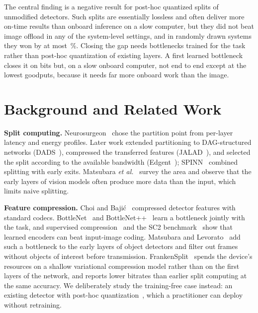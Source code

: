 \documentclass[journal,twocolumn,10pt]{IEEEtran}
\begin{document}
The central finding is a negative result for post-hoc quantized splits of unmodified detectors. Such splits are essentially lossless and often deliver more on-time results than onboard inference on a slow computer, but they did not beat image offload in any of the \NumCells{} system-level settings, and in randomly drawn systems they won by at most \GenMaxSplitGainPct\,\%. Closing the gap needs bottlenecks trained for the task~\cite{matsubara2023sc2,shao2020bottlenetpp} rather than post-hoc quantization of existing layers. A first learned bottleneck closes it on bits but, on a slow onboard computer, not end to end except at the lowest goodputs, because it needs far more onboard work than the image.

\section{Background and Related Work}
\textbf{Split computing.} Neurosurgeon~\cite{kang2017neurosurgeon} chose the partition point from per-layer latency and energy profiles. Later work extended partitioning to DAG-structured networks (DADS~\cite{hu2019dads}), compressed the transferred features (JALAD~\cite{li2018jalad}), and selected the split according to the available bandwidth (Edgent~\cite{li2020edgent}); SPINN~\cite{laskaridis2020spinn} combined splitting with early exits. Matsubara \emph{et al.}~\cite{matsubara2022survey} survey the area and observe that the early layers of vision models often produce more data than the input, which limits naive splitting.

\textbf{Feature compression.} Choi and Baji\'{c}~\cite{choi2018deep} compressed detector features with standard codecs. BottleNet~\cite{eshratifar2019bottlenet} and BottleNet++~\cite{shao2020bottlenetpp} learn a bottleneck jointly with the task, and supervised compression~\cite{matsubara2022supervised} and the SC2 benchmark~\cite{matsubara2023sc2} show that learned encoders can beat input-image coding. Matsubara and Levorato~\cite{matsubara2021neural} add such a bottleneck to the early layers of object detectors and filter out frames without objects of interest before transmission. FrankenSplit~\cite{furutanpey2024frankensplit} spends the device's resources on a shallow variational compression model rather than on the first layers of the network, and reports lower bitrates than earlier split computing at the same accuracy. We deliberately study the training-free case instead: an existing detector with post-hoc quantization~\cite{jacob2018quantization,krishnamoorthi2018quantizing}, which a practitioner can deploy without retraining.
\end{document}
